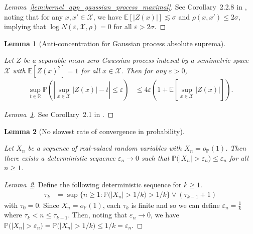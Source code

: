 \documentclass[11pt,lof]{puthesis}
\renewcommand{\P}{\ensuremath{\mathbb{P}}}
\newcommand{\R}{\ensuremath{\mathbb{R}}}
\newcommand{\E}{\ensuremath{\mathbb{E}}}
\newcommand{\cX}{\ensuremath{\mathcal{X}}}
\theoremstyle{break}
\newtheorem{lemma}{Lemma}[section]
\theoremstyle{proof}
\newtheorem{proof}{Proof}
\begin{document}
\begin{proof}[Lemma~\ref{lem:kernel_app_gaussian_process_maximal}]

  See Corollary~2.2.8 in \citet{van1996weak},
  noting that for any $x,x' \in \cX$, we have
  $\E[|Z(x)|] \lesssim \sigma$ and
  $\rho(x,x') \leq 2\sigma$,
  implying that
  $\log N(\varepsilon, \cX, \rho) = 0$
  for all
  $\varepsilon > 2 \sigma$.
\end{proof}

\begin{lemma}[Anti-concentration for Gaussian process absolute suprema]
  \label{lem:kernel_app_anticoncentration}

  Let $Z$ be a separable mean-zero Gaussian process
  indexed by a semimetric space $\cX$ with
  $\E[Z(x)^2] = 1$
  for all $x \in \cX$.
  Then for any $\varepsilon > 0$,
  \begin{align*}
    \sup_{t \in \R}
    \P\left(
      \left|
      \sup_{x \in \cX}
      \big| Z(x) \big|
      - t
      \right|
      \leq \varepsilon
    \right)
    &\leq
    4 \varepsilon
    \left(
      1 + \E\left[
        \sup_{x \in \cX}
        \big| Z(x) \big|
      \right]
    \right).
  \end{align*}

\end{lemma}

\begin{proof}[Lemma~\ref{lem:kernel_app_anticoncentration}]

  See Corollary~2.1
  in \citet{chernozhukov2014anti}.
\end{proof}

\begin{lemma}[No slowest rate of convergence in probability]
  \label{lem:kernel_app_slow_convergence}

  Let $X_n$ be a sequence of real-valued random
  variables with
  $X_n = o_\P(1)$.
  Then there exists a deterministic sequence
  $\varepsilon_n \to 0$
  such that
  $\P\big(|X_n| > \varepsilon_n\big) \leq \varepsilon_n$
  for all $n \geq 1$.

\end{lemma}

\begin{proof}[Lemma~\ref{lem:kernel_app_slow_convergence}]

  Define the following deterministic sequence
  for $k \geq 1$.
  \begin{align*}
    \tau_k
    &=
    \sup
    \big\{
      n \geq 1:
      \P\big(|X_n| > 1/k\big)
      > 1/k
    \big\}
    \vee
    (\tau_{k-1} +1)
  \end{align*}
  with $\tau_0 = 0$.
  Since $X_n = o_\P(1)$,
  each $\tau_k$ is finite
  and so we can define
  $\varepsilon_n = \frac{1}{k}$
  where $\tau_k < n \leq \tau_{k+1}$.
  Then, noting that $\varepsilon_n \to 0$,
  we have
  $\P\big(|X_n| > \varepsilon_n\big)
  = \P\big(|X_n| > 1/k\big) \leq 1/k = \varepsilon_n$.
\end{proof}
\end{document}
